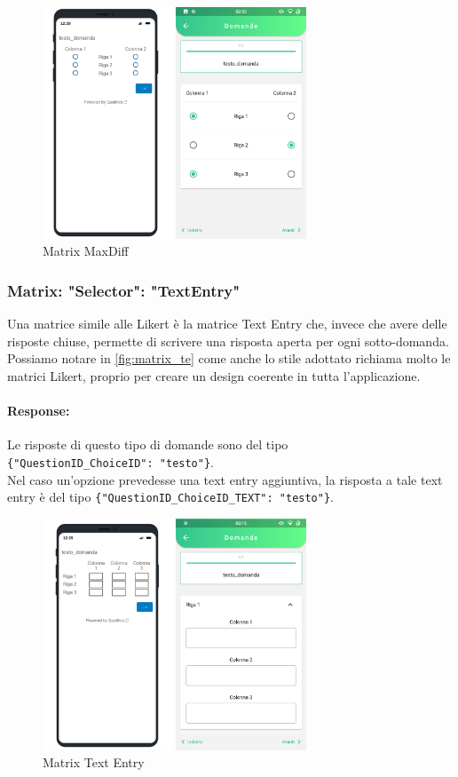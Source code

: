 \begin{figure}[h!]
\centering
\includegraphics[width=0.7\textwidth]{img/matrix_maxdiff}
\caption{Matrix MaxDiff}
\label{fig:matrix_maxdiff}
\end{figure}

\clearpage
\subsubsection{Matrix: "Selector": "TextEntry"}
Una matrice simile alle Likert è la matrice Text Entry che, invece che avere delle risposte chiuse, permette di scrivere una risposta aperta per ogni sotto-domanda. Possiamo notare in \autoref{fig:matrix_te} come anche lo stile adottato richiama molto le matrici Likert, proprio per creare un design coerente in tutta l'applicazione.

\paragraph{Response:}
Le risposte di questo tipo di domande sono del tipo\\ \texttt{\{"QuestionID\_ChoiceID": "testo"\}}.\\Nel caso un'opzione prevedesse una text entry aggiuntiva, la risposta a tale text entry è del tipo \texttt{\{"QuestionID\_ChoiceID\_TEXT": "testo"\}}.

\begin{figure}[h!]
\centering
\includegraphics[width=0.7\textwidth]{img/matrix_te}
\caption{Matrix Text Entry}
\label{fig:matrix_te}
\end{figure}

